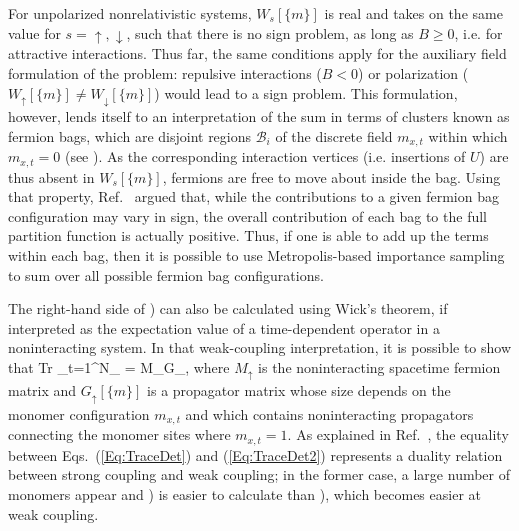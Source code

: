 \documentclass[../main.tex]{subfiles}
\begin{document}
For unpolarized nonrelativistic systems, $W_s[\{ m\}]$ is real and takes on the same value for $s = \uparrow,\downarrow$, such that there is no sign problem,
as long as $B \geq 0$, i.e. for attractive interactions. Thus far, the same conditions apply for the auxiliary field formulation of the problem: repulsive interactions
($B < 0$) or polarization ($W_\uparrow[\{ m\}] \neq W_\downarrow[\{ m\}]$) would lead to a sign problem. This formulation, however, lends itself to an interpretation of the sum
in terms of clusters known as fermion bags, which are disjoint regions ${\mathcal B}_i$ of the discrete field $m_{x,t}$ within which $m_{x,t} = 0$ (see
). As the corresponding interaction vertices (i.e. insertions of $U$) are thus absent in $W_s[\{ m\}]$, fermions are free to move about inside the
bag. Using that property, Ref.~\cite{PhysRevD.82.025007} argued that, while the contributions to a given fermion bag configuration may vary in sign, the overall contribution
of each bag to the full partition function is actually positive. Thus, if one is able to add up the terms within each bag, then it is possible to use Metropolis-based importance
sampling to sum over all possible fermion bag configurations.

The right-hand side of ) can also be calculated using Wick's theorem, if interpreted as the expectation value of a time-dependent operator
in a noninteracting system. In that weak-coupling interpretation, it is possible to show that
%
\beq
\label{Eq:TraceDet2}
\textrm{Tr} \prod_{t=1}^{N_\tau}
 = \det M_\uparrow  \det G_\uparrow[\{ m\}],
\eeq
%
where $M_\uparrow$ is the noninteracting spacetime fermion matrix and $G_\uparrow[\{ m\}]$ is a propagator matrix whose size depends on the
monomer configuration $m_{x,t}$ and which contains noninteracting propagators connecting the monomer sites where $m_{x,t} = 1$.
As explained in Ref.~\cite{Chandrasekharan:2013rpa}, the equality between Eqs.~(\ref{Eq:TraceDet}) and (\ref{Eq:TraceDet2}) represents a
duality relation between strong coupling and weak coupling; in the former case, a large number of monomers appear and ) is easier
to calculate than ), which becomes easier at weak coupling.
\end{document}

